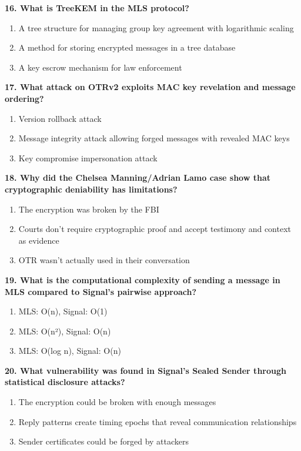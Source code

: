 \documentclass[10pt,a4paper,american]{article}
\begin{document}
\textbf{16. What is TreeKEM in the MLS protocol?}
\begin{enumerate}[label=\alph*)]
	\item A tree structure for managing group key agreement with logarithmic scaling
	\item A method for storing encrypted messages in a tree database
	\item A key escrow mechanism for law enforcement
\end{enumerate}

\vspace{0.5em}

\textbf{17. What attack on OTRv2 exploits MAC key revelation and message ordering?}
\begin{enumerate}[label=\alph*)]
	\item Version rollback attack
	\item Message integrity attack allowing forged messages with revealed MAC keys
	\item Key compromise impersonation attack
\end{enumerate}

\vspace{0.5em}

\textbf{18. Why did the Chelsea Manning/Adrian Lamo case show that cryptographic deniability has limitations?}
\begin{enumerate}[label=\alph*)]
	\item The encryption was broken by the FBI
	\item Courts don't require cryptographic proof and accept testimony and context as evidence
	\item OTR wasn't actually used in their conversation
\end{enumerate}

\vspace{0.5em}

\textbf{19. What is the computational complexity of sending a message in MLS compared to Signal's pairwise approach?}
\begin{enumerate}[label=\alph*)]
	\item MLS: O(n), Signal: O(1)
	\item MLS: O(n²), Signal: O(n)
	\item MLS: O(log n), Signal: O(n)
\end{enumerate}

\vspace{0.5em}

\textbf{20. What vulnerability was found in Signal's Sealed Sender through statistical disclosure attacks?}
\begin{enumerate}[label=\alph*)]
	\item The encryption could be broken with enough messages
	\item Reply patterns create timing epochs that reveal communication relationships
	\item Sender certificates could be forged by attackers
\end{enumerate}

\vspace{2cm}

\end{document}
